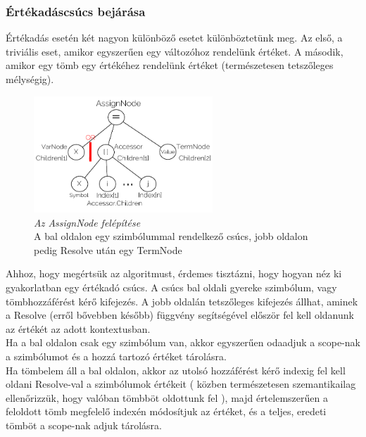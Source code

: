 \documentclass[a4paper,12pt]{report}
\begin{document}


\subsubsection{Értékadáscsúcs bejárása}
Értékadás esetén két nagyon különböző esetet különböztetünk meg. Az első, a triviális eset, amikor egyszerűen egy változóhoz rendelünk értéket. A második, amikor egy tömb egy értékéhez rendelünk értéket (természetesen tetszőleges mélységig). \\
\begin{figure}
  \caption{\textit{Az AssignNode felépítése} \\
  A bal oldalon egy szimbólummal rendelkező csúcs, jobb oldalon pedig Resolve után egy TermNode }
  \centering
    \includegraphics[width=0.6\textwidth]{images/assignnode.pdf}
\end{figure}
Ahhoz, hogy megértsük az algoritmust, érdemes tisztázni, hogy hogyan néz ki gyakorlatban egy értékadó csúcs. A csúcs bal oldali gyereke szimbólum, vagy tömbhozzáférést kérő kifejezés. A jobb oldalán tetszőleges kifejezés állhat, aminek a Resolve (erről bővebben később) függvény segítségével először fel kell oldanunk az értékét az adott kontextusban. \\

Ha a bal oldalon csak egy szimbólum van, akkor egyszerűen odaadjuk a scope-nak a szimbólumot és a hozzá tartozó értéket tárolásra. \\
Ha tömbelem áll a bal oldalon, akkor az utolsó hozzáférést kérő indexig fel kell oldani Resolve-val a szimbólumok értékeit ( közben természetesen szemantikailag ellenőrizzük, hogy valóban tömbböt oldottunk fel ), majd értelemszerűen a feloldott tömb megfelelő indexén módosítjuk az értéket, és a teljes, eredeti tömböt a scope-nak adjuk tárolásra. \\

\end{document}
